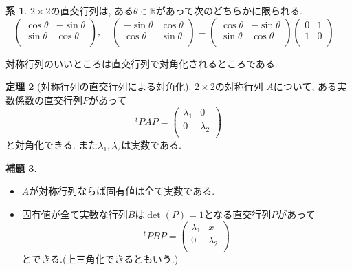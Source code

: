 \documentclass[dvipdfmx,a4paper,11pt]{article}
\newcommand{\R}{\mathbb{R}}
\theoremstyle{definition}
\newtheorem{thm}{定理}
\newtheorem{lem}[thm]{補題}
\newtheorem{cor}[thm]{系}
\begin{document}
 
  \begin{tcolorbox}[
    colback = white,
    colframe = green!35!black,
    fonttitle = \bfseries,
    breakable = true]
    \begin{cor}
$2 \times 2$の直交行列は, ある$\theta \in\R$があって次のどちらかに限られる. 
$$
\begin{pmatrix}
\cos \theta & -\sin \theta\\
\sin \theta& \cos \theta  \\
\end{pmatrix},
\quad
\begin{pmatrix}
 -\sin \theta&\cos \theta \\
\cos \theta & \sin \theta\\
\end{pmatrix}
=
\begin{pmatrix}
\cos \theta & -\sin \theta\\
\sin \theta& \cos \theta  \\
\end{pmatrix}
\begin{pmatrix}
0 & 1\\
1& 0\\
\end{pmatrix}
\quad
$$
\end{cor}
 \end{tcolorbox}
 

対称行列のいいところは直交行列で対角化されるところである.
  \begin{tcolorbox}[
    colback = white,
    colframe = green!35!black,
    fonttitle = \bfseries,
    breakable = true]
    \begin{thm}[対称行列の直交行列による対角化]
$2 \times 2$の対称行列
$A$について, ある実数係数の直交行列$P$があって
$$
{}^tPA P=
\begin{pmatrix}
\lambda_1& 0 \\
0& \lambda_2\\
\end{pmatrix}
$$
と対角化できる. また$\lambda_1,\lambda_2$は実数である. 
  \end{thm}
 \end{tcolorbox}
 
 
 
 
  \begin{tcolorbox}[
    colback = white,
    colframe = green!35!black,
    fonttitle = \bfseries,
    breakable = true]
    \begin{lem}
\begin{itemize}
\setlength{\parskip}{0cm}
 \setlength{\itemsep}{0pt} 
\item $A$が対称行列ならば固有値は全て実数である.
\item 固有値が全て実数な行列$B$は$\det(P)=1$となる直交行列$P$があって
$$
{}^tP BP=
\begin{pmatrix}
\lambda_1& x \\
0& \lambda_2\\
\end{pmatrix}
$$
とできる.(上三角化できるともいう.)
\end{itemize}
\end{lem}
 \end{tcolorbox}
 
\end{document}
